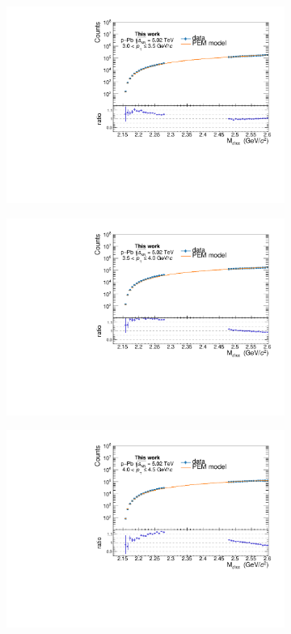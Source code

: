 \begin{appendices}
\begin{figure}[htb]
\begin{subfigure}{.5\textwidth}
  \includegraphics[width=\linewidth]{gfx/appendix/pem/can_blindPEM6}
  \caption{}
\end{subfigure}%
\begin{subfigure}{.5\textwidth}
  \centering
  \captionsetup{justification=centering}
  \includegraphics[width=\linewidth]{gfx/appendix/pem/can_blindPEM7}
  \caption{}
\end{subfigure}
\begin{subfigure}{.5\textwidth}
  \centering
  \captionsetup{justification=centering}
  \includegraphics[width=\linewidth]{gfx/appendix/pem/can_blindPEM8}

\end{subfigure}
\end{figure}
\end{appendices}
